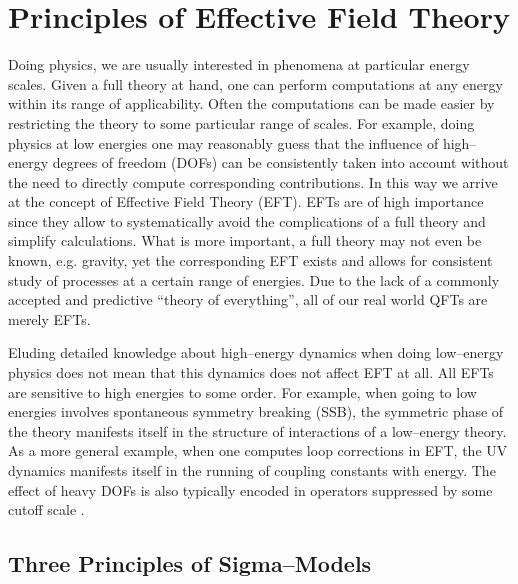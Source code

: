\documentclass[12pt]{article}
\begin{document}
\section{Principles of Effective Field Theory}
\label{sec:princ}

Doing physics, we are usually interested in phenomena at particular energy scales. Given a full theory at hand, one can perform computations at any energy within its range of applicability. Often the computations can be made easier by restricting the theory to some particular range of scales. For example, doing physics at low energies one may reasonably guess that the influence of high--energy degrees of freedom (DOFs) can be consistently taken into account without the need to directly compute corresponding contributions.
In this way we arrive at the concept of Effective Field Theory (EFT).
EFTs are of high importance since they allow to
systematically avoid the complications of a full theory and simplify calculations. What is more important, a full theory may not even be known, e.g. gravity, yet the corresponding EFT exists and allows for consistent study of processes at a certain range of energies.
Due to the lack of a commonly accepted and predictive ``theory of everything'', all of our real world QFTs are merely EFTs.

Eluding detailed knowledge about high--energy dynamics when doing low--energy physics does not mean that this dynamics does not affect EFT at all.
All EFTs are sensitive to high energies to some order. For example, when going to low energies involves spontaneous symmetry breaking (SSB), the symmetric phase of the theory manifests itself in the structure of interactions of a low--energy theory.
As a more general example, when one computes loop corrections in EFT,
the UV dynamics manifests itself in the running of coupling constants with energy.
The effect of heavy DOFs is also typically encoded in operators suppressed by some cutoff scale \cite{Appelquist:1974tg,Ovrut:1980eq}.

\subsection{Three Principles of Sigma--Models}
\label{sec:threesigma}
\end{document}
